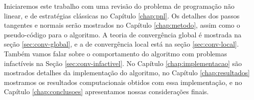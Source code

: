 Iniciaremos este trabalho com uma revisão do problema de programação não linear,
e de estratégias clássicas no Capítulo \ref{chap:pnl}.
Os detalhes dos
passos tangentes e normais serão mostrados no Capítulo \ref{chap:metodo}, assim
como o pseudo-código para o algoritmo. A teoria de convergência global é
mostrada na seção \ref{sec:conv-global}, e a de convergência local está na seção
\ref{sec:conv-local}. Também vamos falar sobre o comportamento do algoritmo
com problemas infactíveis na Seção \ref{sec:conv-infactivel}. No Capítulo
\ref{chap:implementacao} são mostrados
detalhes da implementação do algoritmo, no Capítulo \ref{chap:resultados}
mostramos os resultados computacionais obtidos com essa implementação, e no
Capítulo \ref{chap:conclusoes} apresentamos nossas considerações finais.
